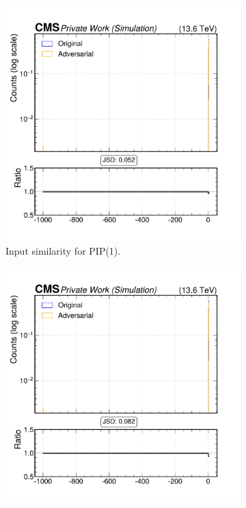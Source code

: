 \begin{figure}[h]
  \centering
  \begin{subfigure}[t]{0.32\textwidth}
    \includegraphics[width=\linewidth]{media/output/features/compare/intprob_1/cmp_global_features_TagVarCSV_vertexCategory.pdf}
    \caption{Input similarity for PIP(1).}
  \end{subfigure}\hfill
  \begin{subfigure}[t]{0.32\textwidth}
    \includegraphics[width=\linewidth]{media/output/features/compare/intprob_2/cmp_global_features_TagVarCSV_vertexCategory.pdf}

\end{subfigure}
\end{figure}
